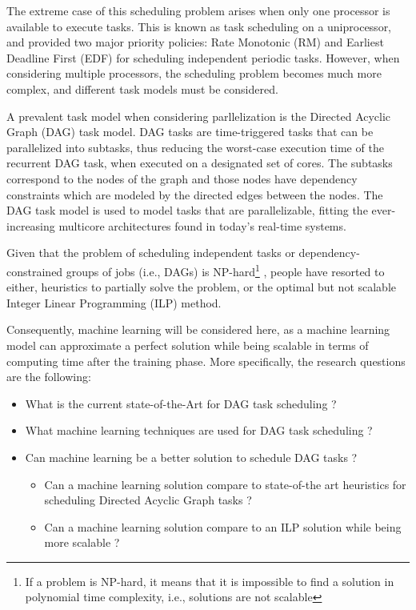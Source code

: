 The extreme case of this scheduling problem arises when only one 
processor is available to execute tasks. This is known as task 
scheduling on a uniprocessor, and \cite{liu1973scheduling} 
provided two major priority policies: Rate Monotonic (RM) and 
Earliest Deadline First (EDF) for scheduling independent periodic tasks. 
However, when considering multiple processors, the scheduling 
problem becomes much more complex, and different task models must 
be considered.

A prevalent task model when considering parllelization
is the Directed Acyclic Graph (DAG) task model.
DAG tasks are time-triggered tasks
that can be parallelized into subtasks,
thus reducing the worst-case execution time of the recurrent DAG task, when executed on a designated set of cores.
The subtasks correspond to the nodes of the graph and
those nodes have dependency constraints which are modeled by the directed edges between the nodes.
The DAG task model is used to model tasks that are parallelizable\cite{baruah2012DAGdef},
fitting the ever-increasing multicore architectures found in today's real-time systems. 

Given that the problem of scheduling independent tasks or dependency-constrained groups of jobs (i.e., DAGs) is NP-hard\footnote{If a problem is 
NP-hard, it means that it is impossible to find a solution in 
polynomial time complexity, i.e., solutions are not scalable}\cite{du1989schedNPhard}
\cite{ULLMAN1975NPhard}, 
people have resorted to either, heuristics 
to partially solve the problem,
or the optimal but not scalable Integer Linear Programming
(ILP) method.

Consequently, machine learning will be considered here, as 
a machine learning model can 
approximate a perfect solution while being 
scalable in terms of computing time after the training phase\cite{Zhao2024GATDRLmodel}\cite{Lee2021GlobalDagSchedDRL}. 
More specifically, the research questions are the following:

\begin{itemize}
    \item [RQ1] What is the current state-of-the-Art for DAG task scheduling ?        
    \item [RQ2] What machine learning  techniques are used for DAG task scheduling ?
    \item [RQ3]  Can machine learning be a better solution to schedule DAG tasks ?
            \begin{itemize}
                \item [RQ3.1] Can a machine learning solution compare to state-of-the art heuristics for scheduling Directed Acyclic Graph tasks ?
                \item [RQ3.2] Can a machine learning solution compare to an ILP solution while being more scalable ?
            \end{itemize}    
\end{itemize}

